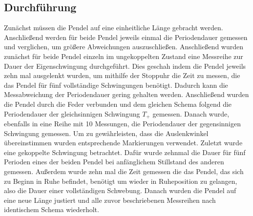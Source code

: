 \subsection{Durchführung}
Zunächst müssen die Pendel auf eine einheitliche Länge gebracht werden. 
Anschließend werden für beide Pendel jeweils einmal die Periodendauer gemessen 
und verglichen, um größere Abweichungen auszuschließen. Anschließend wurden zunächst 
für beide Pendel einzeln im ungekoppelten Zustand eine Messreihe zur Dauer der Eigenschwingung 
durchgeführt. Dies geschah indem die Pendel jeweils zehn mal ausgelenkt wurden, um mithilfe der 
Stoppuhr die Zeit zu messen, die das Pendel für fünf vollständige Schwingungen benötigt. Dadurch 
kann die Messabweichung der Periodendauer gering gehalten werden. \newline Anschließend wurden die 
Pendel durch die Feder verbunden und dem gleichen Schema folgend die Periodendauer der gleichsinnigen 
Schwingung $T_+$ gemessen.  \newline Danach wurde, ebenfalls in eine Reihe mit 10 Messungen, 
die Periodendauer der gegensinnigen Schwingung gemessen. Um zu gewährleisten, dass die Auslenkwinkel 
übereinstimmen wurden entsprechende Markierungen verwendet. \newline Zuletzt wurde eine gekoppelte 
Schwingung betrachtet. Dafür wurde zehnmal die Dauer für fünf Perioden eines der beiden Pendel bei 
anfänglichem Stillstand des anderen gemessen. Außerdem wurde zehn mal die Zeit gemessen die das Pendel, 
das sich zu Beginn in Ruhe befindet, benötigt um wieder in Ruheposition zu gelangen, also die Dauer einer 
vollständigen Schwebung. Danach wurden die Pendel auf eine neue Länge justiert und alle zuvor beschriebenen 
Messreihen nach identischem Schema wiederholt. 

